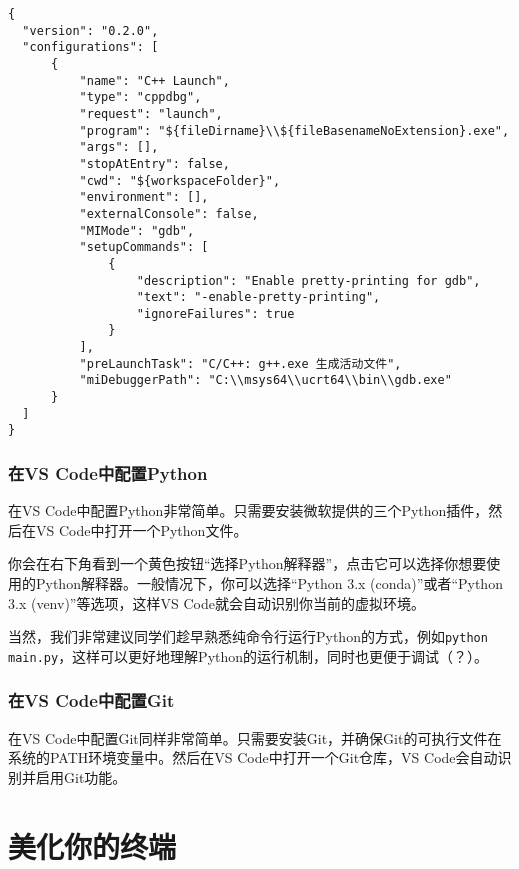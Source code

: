 \documentclass[../main.tex]{subfiles}
\begin{document}
\begin{lstlisting}
{
  "version": "0.2.0",
  "configurations": [
      {
          "name": "C++ Launch",
          "type": "cppdbg",
          "request": "launch",
          "program": "${fileDirname}\\${fileBasenameNoExtension}.exe",
          "args": [],
          "stopAtEntry": false,
          "cwd": "${workspaceFolder}",
          "environment": [],
          "externalConsole": false,
          "MIMode": "gdb",
          "setupCommands": [
              {
                  "description": "Enable pretty-printing for gdb",
                  "text": "-enable-pretty-printing",
                  "ignoreFailures": true
              }
          ],
          "preLaunchTask": "C/C++: g++.exe 生成活动文件",
          "miDebuggerPath": "C:\\msys64\\ucrt64\\bin\\gdb.exe"
      }
  ]
}
\end{lstlisting}

\subsubsection{在VS Code中配置Python}

在VS Code中配置Python非常简单。只需要安装微软提供的三个Python插件，然后在VS Code中打开一个Python文件。

你会在右下角看到一个黄色按钮“选择Python解释器”，点击它可以选择你想要使用的Python解释器。一般情况下，你可以选择“Python 3.x (conda)”或者“Python 3.x (venv)”等选项，这样VS Code就会自动识别你当前的虚拟环境。

当然，我们非常建议同学们趁早熟悉纯命令行运行Python的方式，例如\texttt{python main.py}，这样可以更好地理解Python的运行机制，同时也更便于调试（？）。

\subsubsection{在VS Code中配置Git}

在VS Code中配置Git同样非常简单。只需要安装Git，并确保Git的可执行文件在系统的PATH环境变量中。然后在VS Code中打开一个Git仓库，VS Code会自动识别并启用Git功能。

\section{美化你的终端}
\end{document}
